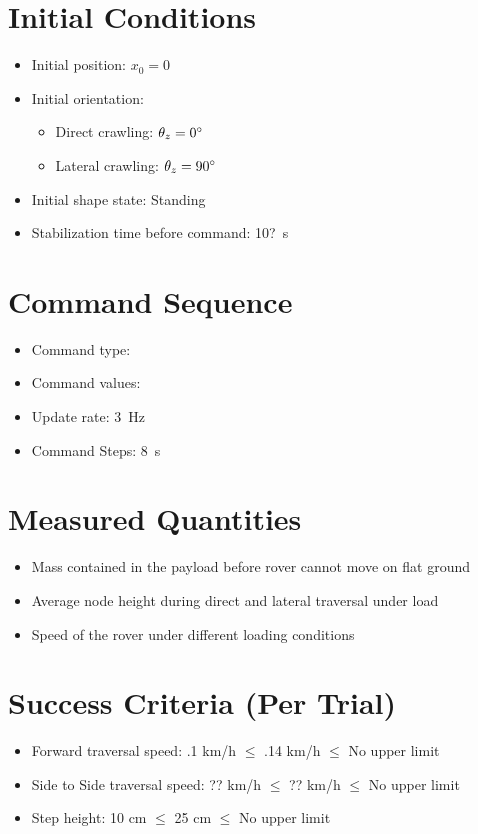 \documentclass[11pt]{article}
\begin{document}
\section*{Initial Conditions}
\begin{itemize}[noitemsep]
    \item Initial position: $x_0 = 0$
    \item Initial orientation: 
    \begin{itemize}
        \item Direct crawling: $\theta_z = 0 {\degree}$
        \item Lateral crawling:  $\theta_z = 90 {\degree}$
    \end{itemize}
    \item Initial shape state: Standing
    \item Stabilization time before command: 10?~s
\end{itemize}

\section*{Command Sequence}
\begin{itemize}[noitemsep]
    \item Command type: \underline{\hspace{5cm}}
    \item Command values: \underline{\hspace{5cm}}
    \item Update rate: 3~Hz
    \item Command Steps: 8~s
\end{itemize}

\section*{Measured Quantities}
\begin{itemize}[noitemsep]
    \item Mass contained in the payload before rover cannot move on flat ground
    \item Average node height during direct and lateral traversal under load
    \item Speed of the rover under different loading conditions
\end{itemize}

\section*{Success Criteria (Per Trial)}
\begin{itemize}[noitemsep]
    \item Forward traversal speed: .1 km/h  $\leq$ .14 km/h $\leq$ No upper limit
    \item Side to Side traversal speed: ?? km/h  $\leq$ ?? km/h $\leq$ No upper limit
    \item  Step height: 10 cm  $\leq$ 25 cm $\leq$ No upper limit
\end{itemize}
\end{document}
